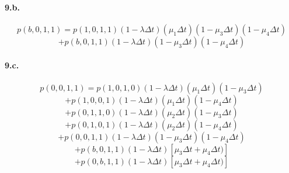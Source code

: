 \documentclass{article}
\begin{document}
   \paragraph{9.b.}
      $$p(b,0,1,1) = p(1,0,1,1) (1 - \lambda \Delta t) (\mu_1 \Delta t) (1 - \mu_3 \Delta t) (1 - \mu_4 \Delta t)$$
      $$           + p(b,0,1,1) (1 - \lambda \Delta t) (1 - \mu_3 \Delta t) (1 - \mu_4 \Delta t)$$

   \paragraph{9.c.}
      $$p(0,0,1,1) = p(1,0,1,0) (1 - \lambda \Delta t) (\mu_1 \Delta t) (1 - \mu_3 \Delta t)$$
      $$           + p(1,0,0,1) (1 - \lambda \Delta t) (\mu_1 \Delta t) (1 - \mu_4 \Delta t)$$
      $$           + p(0,1,1,0) (1 - \lambda \Delta t) (\mu_2 \Delta t) (1 - \mu_3 \Delta t)$$
      $$           + p(0,1,0,1) (1 - \lambda \Delta t) (\mu_2 \Delta t) (1 - \mu_4 \Delta t)$$
      $$           + p(0,0,1,1) (1 - \lambda \Delta t) (1 - \mu_3 \Delta t) (1 - \mu_4 \Delta t)$$
      $$           + p(b,0,1,1) (1 - \lambda \Delta t) [\mu_3 \Delta t + \mu_4 \Delta t)]$$
      $$           + p(0,b,1,1) (1 - \lambda \Delta t) [\mu_3 \Delta t + \mu_4 \Delta t)]$$
\end{document}
